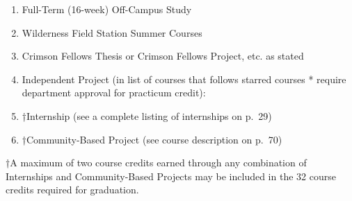 \documentclass[
  letterpaper,
]{scrbook}
\providecommand{\tightlist}{%
  \setlength{\itemsep}{0pt}\setlength{\parskip}{0pt}}
\begin{document}
\begin{enumerate}
\def\labelenumi{\arabic{enumi}.}
\tightlist
\item
  Full-Term (16-week) Off-Campus Study
\item
  Wilderness Field Station Summer Courses
\item
  Crimson Fellows Thesis or Crimson Fellows Project, etc. as stated
\item
  Independent Project (in list of courses that follows starred courses *
  require department approval for practicum credit):
\item
  †Internship (see a complete listing of internships on p.~29)
\item
  †Community-Based Project (see course description on p.~70)
\end{enumerate}

†A maximum of two course credits earned through any combination of
Internships and Community-Based Projects may be included in the 32
course credits required for graduation.
\end{document}
